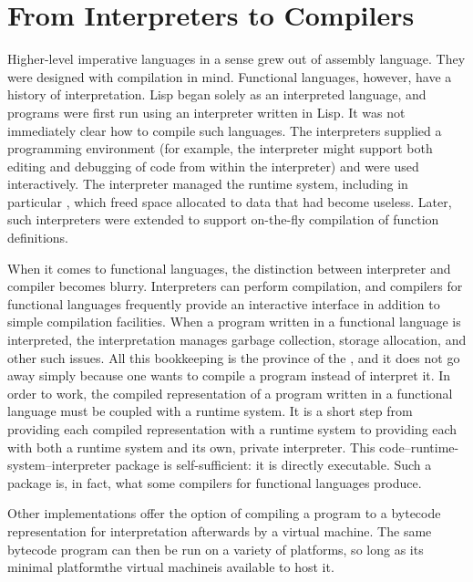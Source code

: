 \label{functional:compiling}
\section{From Interpreters to Compilers}
Higher-level imperative languages in a sense grew out of assembly language. They were designed with compilation in mind. Functional languages, however, have a history of interpretation. Lisp began solely as an interpreted language, and  programs were first run using an interpreter written in Lisp. It was not immediately clear how to compile such languages. The interpreters supplied a programming environment (for example, the interpreter might support both editing and debugging of code from within the interpreter) and were used interactively. The interpreter managed the runtime system, including in particular , which freed space allocated to data that had become useless. Later, such interpreters were extended to support on-the-fly compilation of function definitions.

When it comes to functional languages, the distinction between interpreter and compiler becomes blurry. Interpreters can perform compilation, and compilers for functional languages frequently provide an interactive interface in addition to simple compilation facilities. When a program written in a functional language is interpreted, the interpretation manages garbage collection, storage allocation, and other such issues. All this bookkeeping is the province of the , and it does not go away simply because one wants to compile a program instead of interpret it. In order to work, the compiled representation of a program written in a functional language must be coupled with a runtime system. It is a short step from providing each compiled representation with a runtime system to providing each with both a runtime system and its own, private interpreter. This code--runtime-system--interpreter package is self-sufficient: it is directly executable. Such a package is, in fact, what some compilers for functional languages produce.

Other implementations offer the option of compiling a program to a bytecode representation for interpretation afterwards by a virtual machine. The same bytecode program can then be run on a variety of platforms, so long as its minimal platform\empause the virtual machine\empause is available to host it.

